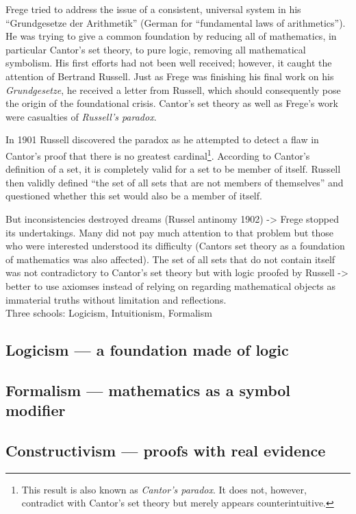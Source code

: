 \documentclass[hidelinks]{article}
\theoremstyle{plain}
\theoremstyle{definition}
\theoremstyle{rem}
\begin{document}
Frege tried to address the issue of a consistent, universal system in his ``Grundgesetze der Arithmetik'' (German for ``fundamental laws of arithmetics''). He was trying to give a common foundation by reducing all of mathematics, in particular Cantor's set theory, to pure logic, removing all mathematical symbolism. His first efforts had not been well received; however, it caught the attention of Bertrand Russell. Just as Frege was finishing his final work on his \textit{Grundgesetze}, he received a letter from Russell, which should consequently pose the origin of the foundational crisis. Cantor's set theory as well as Frege's work were casualties of \textit{Russell's paradox}.

In 1901 Russell discovered the paradox as he attempted to detect a flaw in Cantor's proof that there is no greatest cardinal\footnote{This result is also known as \textit{Cantor's paradox}. It does not, however, contradict with Cantor's set theory but merely appears counterintuitive.}. According to Cantor's definition of a set, it is completely valid for a set to be member of itself. Russell then validly defined ``the set of all sets that are not members of themselves'' and questioned whether this set would also be a member of itself.


But inconsistencies destroyed dreams (Russel antinomy 1902) -> Frege stopped its undertakings.
Many did not pay much attention to that problem but those who were interested understood its difficulty (Cantors set theory as a foundation of mathematics was also affected).
The set of all sets that do not contain itself was not contradictory to Cantor's set theory but with logic proofed by Russell -> better to use axiomses instead of relying on regarding mathematical objects as immaterial truths without limitation and reflections.\\

Three schools: Logicism, Intuitionism, Formalism\\

\subsection{Logicism --- a foundation made of logic}

\subsection{Formalism --- mathematics as a symbol modifier}

\subsection{Constructivism --- proofs with real evidence}
\end{document}
